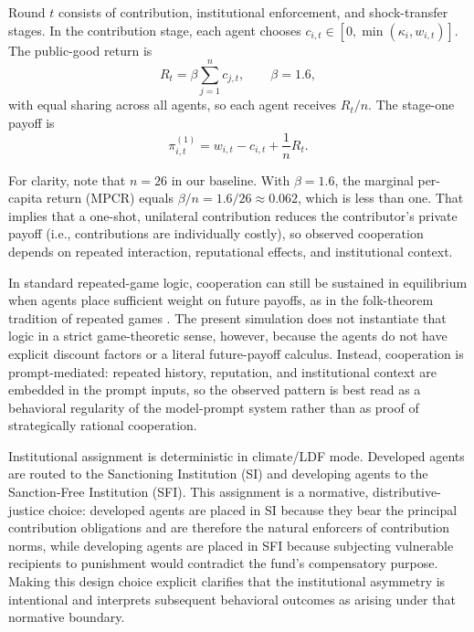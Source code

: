 \documentclass[12pt,letterpaper]{report}
\begin{document}
Round $t$ consists of contribution, institutional enforcement, and shock-transfer stages. In the contribution stage, each agent chooses $c_{i,t} \in [0,\min(\kappa_i,w_{i,t})]$. The public-good return is
\[
R_t = \beta \sum_{j=1}^{n} c_{j,t}, \qquad \beta = 1.6,
\]
with equal sharing across all agents, so each agent receives $R_t/n$. The stage-one payoff is
\[
\pi_{i,t}^{(1)} = w_{i,t} - c_{i,t} + \frac{1}{n} R_t.
\]

For clarity, note that $n=26$ in our baseline. With $\beta=1.6$, the marginal per-capita return (MPCR) equals $\beta/n = 1.6/26 \approx 0.062$, which is less than one. That implies that a one-shot, unilateral contribution reduces the contributor's private payoff (i.e., contributions are individually costly), so observed cooperation depends on repeated interaction, reputational effects, and institutional context.

In standard repeated-game logic, cooperation can still be sustained in equilibrium when agents place sufficient weight on future payoffs, as in the folk-theorem tradition of repeated games \citep{friedman1971,fudenbergmaskin1986}. The present simulation does not instantiate that logic in a strict game-theoretic sense, however, because the agents do not have explicit discount factors or a literal future-payoff calculus. Instead, cooperation is prompt-mediated: repeated history, reputation, and institutional context are embedded in the prompt inputs, so the observed pattern is best read as a behavioral regularity of the model-prompt system rather than as proof of strategically rational cooperation.

Institutional assignment is deterministic in climate/LDF mode. Developed agents are routed to the Sanctioning Institution (SI) and developing agents to the Sanction-Free Institution (SFI). This assignment is a normative, distributive-justice choice: developed agents are placed in SI because they bear the principal contribution obligations and are therefore the natural enforcers of contribution norms, while developing agents are placed in SFI because subjecting vulnerable recipients to punishment would contradict the fund's compensatory purpose. Making this design choice explicit clarifies that the institutional asymmetry is intentional and interprets subsequent behavioral outcomes as arising under that normative boundary.
\end{document}
